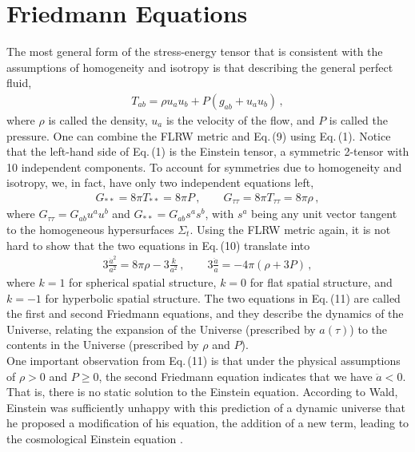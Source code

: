 \documentclass[11pt]{article}
\theoremstyle{break}
\theoremstyle{break}
\begin{document}
\section{Friedmann Equations}
The most general form of the stress-energy tensor that is consistent with the assumptions of homogeneity and isotropy is that describing the general perfect fluid,
\begin{align}
T_{ab} = \rho u_a u_b  + P(g_{ab}+u_au_b)\,,
\end{align}
where $\rho$ is called the density, $u_a$ is the velocity of the flow, and $P$ is called the pressure. One can combine the FLRW metric and Eq.\,(9) using Eq.\,(1). Notice that the left-hand side of Eq.\,(1) is the Einstein tensor, a symmetric 2-tensor with 10 independent components. To account for symmetries due to homogeneity and isotropy, we, in fact, have only two independent equations left, 
\begin{align}
G_{**} = 8\pi T_{**} = 8 \pi P\,,\qquad
G_{\tau\tau} = 8\pi T_{\tau\tau} = 8\pi \rho\,,
\end{align}
where $G_{\tau\tau} = G_{ab}u^au^b$ and $G_{**} = G_{ab}s^a s^b$, with $s^a$ being any unit vector tangent to the homogeneous hypersurfaces $\Sigma_t$. Using the FLRW metric again, it is not hard to show that the two equations in Eq.\,(10) translate into 
\begin{align}
3\frac{\dot{a}^2}{a^2} = 8\pi \rho -3\frac{k}{a^2}\,,\qquad
3\frac{\ddot{a}}{a} = -4\pi (\rho +3P)\,,
\end{align}
where $k=1$ for spherical spatial structure, $k=0$ for flat spatial structure, and $k=-1$ for hyperbolic spatial structure. The two equations in Eq.\,(11) are called the first and second Friedmann equations, and they describe the dynamics of the Universe, relating the expansion of the Universe (prescribed by $a(\tau)$) to the contents in the Universe (prescribed by $\rho$ and $P$). \\

One important observation from Eq.\,(11) is that under the physical assumptions of $\rho>0$ and $P\geq 0$, the second Friedmann equation indicates that we have $\ddot{a} < 0$. That is, there is no static solution to the Einstein equation. According to Wald, Einstein was sufficiently unhappy with this prediction of a dynamic universe that he proposed a modification of his equation, the addition of a new term, leading to the cosmological Einstein equation \cite{Wald}. 
\end{document}
